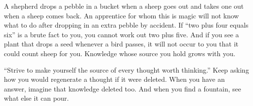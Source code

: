 A shepherd drops a pebble in a bucket when a sheep goes out and takes one out when a sheep comes back. An apprentice for whom this is magic will not know what to do after dropping in an extra pebble by accident. If ``two plus four equals six'' is a brute fact to you, you cannot work out two plus five. And if you see a plant that drops a seed whenever a bird passes, it will not occur to you that it could count sheep for you.  Knowledge whose source you hold grows with you.

``Strive to make yourself the source of every thought worth thinking.'' Keep asking how you would regenerate a thought if it were deleted. When you have an answer, imagine that knowledge deleted too. And when you find a fountain, see what else it can pour. 
